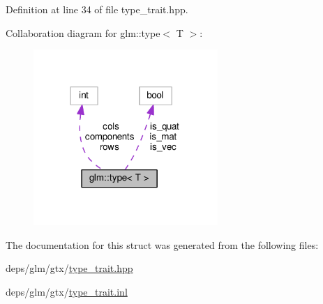 Definition at line 34 of file type\+\_\+trait.\+hpp.



Collaboration diagram for glm\+:\+:type$<$ T $>$\+:
\nopagebreak
\begin{figure}[H]
\begin{center}
\leavevmode
\includegraphics[width=198pt]{de/dfe/structglm_1_1type__coll__graph}
\end{center}
\end{figure}


The documentation for this struct was generated from the following files\+:\begin{DoxyCompactItemize}
\item 
deps/glm/gtx/\hyperlink{type__trait_8hpp}{type\+\_\+trait.\+hpp}\item 
deps/glm/gtx/\hyperlink{type__trait_8inl}{type\+\_\+trait.\+inl}\end{DoxyCompactItemize}
